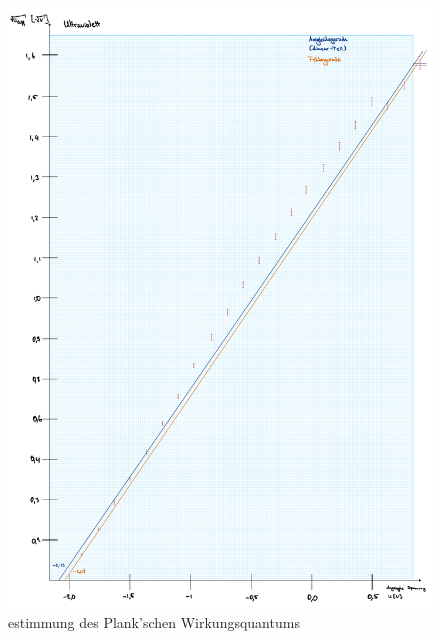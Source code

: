 \begin{figure}[t!]
    \includegraphics[width=1\textwidth, page=6]{img/35/v35-Farbplots.pdf}
    \caption{estimmung des Plank'schen Wirkungsquantums}
    \label{fig:final}
\end{figure}

\twocolumn